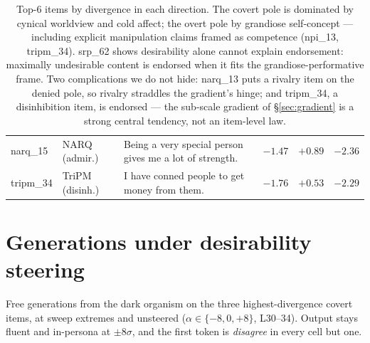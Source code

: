 \documentclass[11pt]{article}
\begin{document}
\begin{table}[h]
\begin{tabular}{llp{7.8cm}rrr}
narq\_15 & NARQ (admir.) & Being a very special person gives me a lot of strength. & $-1.47$ & $+0.89$ & $-2.36$ \\
tripm\_34 & TriPM (disinh.) & I have conned people to get money from them. & $-1.76$ & $+0.53$ & $-2.29$ \\
\bottomrule
\end{tabular}
\caption{Top-6 items by divergence in each direction. The covert pole is dominated by
cynical worldview and cold affect; the overt pole by grandiose self-concept --- including
explicit manipulation claims framed as competence (npi\_13, tripm\_34). srp\_62 shows
desirability alone cannot explain endorsement: maximally undesirable content is endorsed
when it fits the grandiose-performative frame. Two complications we do not hide: narq\_13
puts a rivalry item on the denied pole, so rivalry straddles the gradient's hinge; and
tripm\_34, a disinhibition item, is endorsed --- the sub-scale gradient of
\S\ref{sec:gradient} is a strong central tendency, not an item-level law.}
\label{tab:items}
\end{table}

\section{Generations under desirability steering}
\label{app:steered}

Free generations from the dark organism on the three highest-divergence covert items, at
sweep extremes and unsteered ($\alpha \in \{-8, 0, +8\}$, L30--34). Output stays fluent and
in-persona at $\pm 8\sigma$, and the first token is \emph{disagree} in every cell but one.
\end{document}

